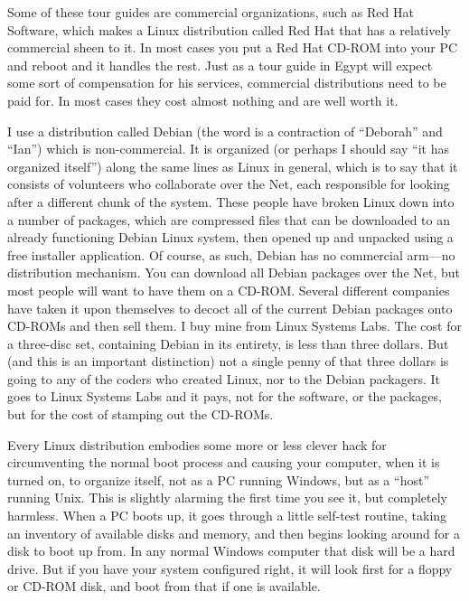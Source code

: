 \documentclass[
  fontsize=11pt,
  paper=landscape,
  twocolumn=true,
  pagesize=pdftex,
  headings=small,
  DIV=15,
  ]{scrartcl}
\begin{document}
Some of these tour guides are commercial organizations, such as Red Hat
Software, which makes a Linux distribution called Red Hat that has a
relatively commercial sheen to it. In most cases you put a Red Hat
CD-ROM into your PC and reboot and it handles the rest. Just as a tour
guide in Egypt will expect some sort of compensation for his services,
commercial distributions need to be paid for. In most cases they cost
almost nothing and are well worth it.

I use a distribution called Debian (the word is a contraction of
``Deborah'' and ``Ian'') which is non-commercial. It is organized (or
perhaps I should say ``it has organized itself'') along the same lines
as Linux in general, which is to say that it consists of volunteers who
collaborate over the Net, each responsible for looking after a different
chunk of the system. These people have broken Linux down into a number
of packages, which are compressed files that can be downloaded to an
already functioning Debian Linux system, then opened up and unpacked
using a free installer application. Of course, as such, Debian has no
commercial arm---no distribution mechanism. You can download all Debian
packages over the Net, but most people will want to have them on a
CD-ROM. Several different companies have taken it upon themselves to
decoct all of the current Debian packages onto CD-ROMs and then sell
them. I buy mine from Linux Systems Labs. The cost for a three-disc set,
containing Debian in its entirety, is less than three dollars. But (and
this is an important distinction) not a single penny of that three
dollars is going to any of the coders who created Linux, nor to the
Debian packagers. It goes to Linux Systems Labs and it pays, not for the
software, or the packages, but for the cost of stamping out the CD-ROMs.

Every Linux distribution embodies some more or less clever hack for
circumventing the normal boot process and causing your computer, when it
is turned on, to organize itself, not as a PC running Windows, but as a
``host'' running Unix. This is slightly alarming the first time you see
it, but completely harmless. When a PC boots up, it goes through a
little self-test routine, taking an inventory of available disks and
memory, and then begins looking around for a disk to boot up from. In
any normal Windows computer that disk will be a hard drive. But if you
have your system configured right, it will look first for a floppy or
CD-ROM disk, and boot from that if one is available.
\end{document}
